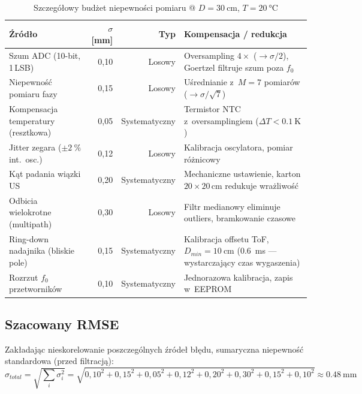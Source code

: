 \documentclass[a4paper,11pt]{article}
\begin{document}
\begin{table}[H]
    \centering
    \caption{Szczegółowy budżet niepewności pomiaru @ $D = \SI{30}{\centi\metre}$, $T = \SI{20}{\celsius}$}
    \label{tab:bledy}
    \begin{tabularx}{\textwidth}{lrrX}
        \toprule
        \textbf{Źródło} & \textbf{$\sigma$ [\si{\milli\metre}]} & \textbf{Typ}
            & \textbf{Kompensacja / redukcja} \\
        \midrule
        Szum ADC (10-bit, 1\,LSB)
            & 0,10
            & Losowy
            & Oversampling $4\times$ ($\to \sigma/2$), Goertzel filtruje szum poza $f_0$ \\
        Niepewność pomiaru fazy
            & 0,15
            & Losowy
            & Uśrednianie z~$M=7$ pomiarów ($\to \sigma/\sqrt{7}$) \\
        Kompensacja temperatury (resztkowa)
            & 0,05
            & Systematyczny
            & Termistor NTC z~oversamplingiem ($\Delta T < \SI{0,1}{\kelvin}$) \\
        Jitter zegara ($\pm\SI{2}{\percent}$ int.\ osc.)
            & 0,12
            & Losowy
            & Kalibracja oscylatora, pomiar różnicowy \\
        Kąt padania wiązki US
            & 0,20
            & Systematyczny
            & Mechaniczne ustawienie, karton $20\times20$\,cm redukuje wrażliwość \\
        Odbicia wielokrotne (multipath)
            & 0,30
            & Losowy
            & Filtr medianowy eliminuje outliers, bramkowanie czasowe \\
        Ring-down nadajnika (bliskie pole)
            & 0,15
            & Systematyczny
            & Kalibracja offsetu ToF, $D_{min} = \SI{10}{\centi\metre}$ (\SI{0,6}{\milli\second} --- wystarczający czas wygaszenia) \\
        Rozrzut $f_0$ przetworników
            & 0,10
            & Systematyczny
            & Jednorazowa kalibracja, zapis w~EEPROM \\
        \bottomrule
    \end{tabularx}
\end{table}

\subsection{Szacowany RMSE}

Zakładając nieskorelowanie poszczególnych źródeł błędu, sumaryczna
niepewność standardowa (przed filtracją):
\begin{equation}
    \sigma_{total} = \sqrt{\sum_i \sigma_i^2}
    = \sqrt{0{,}10^2 + 0{,}15^2 + 0{,}05^2 + 0{,}12^2 + 0{,}20^2 + 0{,}30^2 + 0{,}15^2 + 0{,}10^2}
    \approx \SI{0,48}{\milli\metre}
    \label{eq:sigma_total}
\end{equation}
\end{document}
